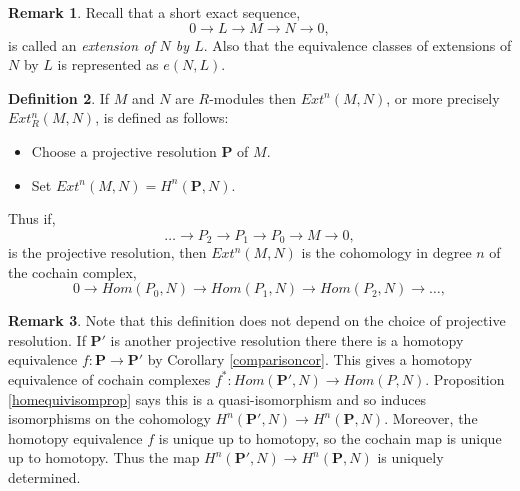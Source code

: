 \documentclass[11.5pt, twoside, a4paper, titlepage]{report}
\theoremstyle{definition}
\newtheorem{mydef}{Definition}[section]
\newtheorem{rem}[mydef]{Remark}
\theoremstyle{plain}
\begin{document}
\begin{rem}
Recall that a short exact sequence, 
\begin{equation*}
0\to L\to M\to N\to 0,
\end{equation*}
is called an \emph{extension of $N$ by $L$}. Also that the equivalence classes of extensions of $N$ by $L$ is represented as $e(N,L)$.
\end{rem}

\begin{mydef}
If $M$ and $N$ are $R$-modules then $Ext^n(M, N)$, or more precisely $Ext^n_R(M, N)$, is defined as follows:
\begin{itemize}
\item Choose a projective resolution $\mathbf{P}$ of $M$.
\item Set $Ext^n(M, N)=H^n(\mathbf{P}, N)$.
\end{itemize}
Thus if, 
\begin{equation*}
\dots \xrightarrow{}P_2 \xrightarrow{} P_1 \xrightarrow{} P_0 \xrightarrow{}M\xrightarrow{}0,
\end{equation*}
 is the projective resolution, then $Ext^n(M, N)$ is the cohomology in degree $n$ of the cochain complex,
\begin{equation*}
0\xrightarrow{} Hom(P_0, N) \xrightarrow{} Hom(P_1, N) \xrightarrow{} Hom(P_2, N)\xrightarrow{} \dots,
\end{equation*}
\end{mydef}
 
\begin{rem}
Note that this definition does not depend on the choice of projective resolution. If $\mathbf{P'}$ is another projective resolution there there is a homotopy equivalence $f: \mathbf{P} \to \mathbf{P'}$ by Corollary \ref{comparisoncor}. This gives a homotopy equivalence of cochain complexes $f^{\ast}: Hom(\mathbf{P'}, N) \to Hom(P, N)$. Proposition \ref{homequivisomprop} says this is a quasi-isomorphism and so induces isomorphisms on the cohomology $H^n(\mathbf{P'}, N) \to H^n(\mathbf{P}, N)$.  Moreover, the homotopy equivalence $f$ is unique up to homotopy, so the cochain map is unique up to homotopy. Thus the map $H^n(\mathbf{P'}, N) \to H^n(\mathbf{P}, N)$ is uniquely determined.
\end{rem}
\end{document}
